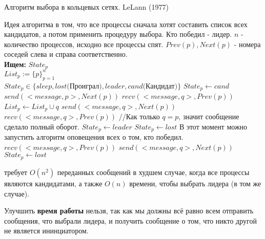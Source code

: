 \begin{algorithm}
\caption{Алгоритм выбора в кольцевых сетях. LeLann (1977)}
\label{algLeLann}
\begin{algorithmic}
\State Идея алгоритма в том, что все процессы сначала хотят составить список всех кандидатов, а потом применить процедуру выбора. Кто победил - лидер. 
\Require $n$ - количество процессов, исходно все процессы спят. $Prev(p), Next(p)$ - номера соседей слева и справа соответственно.\\
\textbf{Ищем:} $State_p$\\
$List_p:=\{p\}_{p=1}^n$ \\ 
$State_p \in \{sleep, lost\text{(Проиграл)}, leader, cand\text{(Кандидат)}\}$ 
 
    \State $State_p \gets cand$
    \State $send(<message, p>, Next(p))$ 
    \State $recv(<message, q>, Prev(p))$ 
     
        \State $List_p \gets List_p \cup {q}$
        \State $send(<message, q>, Next(p))$ 
        \State {}
        \State $recv(<message, q>, Prev(p))$ 
        \State //Как только $q = p$, значит сообщение сделало полный оборот.
    \EndWhile
     
        \State $State_p \gets leader$
    \Else 
        \State $State_p \gets lost$
    \EndIf
    \State В этот момент можно запустить алгоритм оповещения всех о том, кто победил.
\Else[Не инициаторы] 
        \State $recv(<message, q>, Prev(p))$ 
        \State $send(<message, q>, Next(p))$ 
            \State $State_p \gets lost$
        \EndIf
    \EndWhile
\EndIf 
\end{algorithmic}
\end{algorithm}
 требует $O(n^2)$ переданных сообщений в худшем случае, когда все процессы являются кандидатами, а также $O(n)$ времени, чтобы выбрать лидера (в том же случае).

Улучшить \textbf{время работы} нельзя, так как мы должны всё равно всем отправить сообщения, что выбрали лидера, и получить сообщение о том, что никто другой не является ининциатором.


